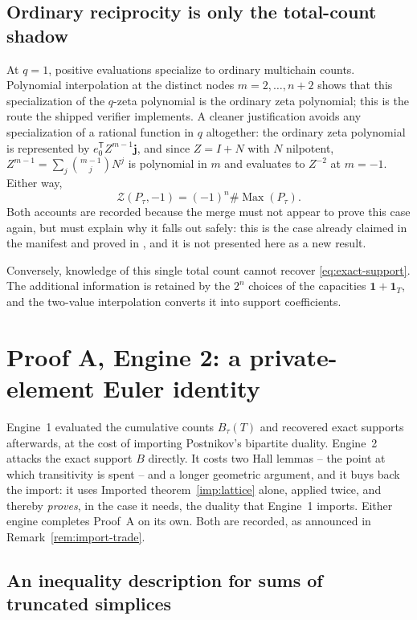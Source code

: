 \documentclass[11pt]{article}
\numberwithin{equation}{section}
\theoremstyle{definition}
\theoremstyle{remark}
\newcommand{\one}{\mathbf 1}
\newcommand{\Max}{\operatorname{Max}}
\newcommand{\Zeta}{\mathcal Z}
\begin{document}
\subsection{Ordinary reciprocity is only the total-count shadow}
\label{sec:shadow}

At $q=1$, positive evaluations specialize to ordinary multichain counts.
Polynomial interpolation at the distinct nodes $m=2,\ldots,n+2$ shows that
this specialization of the $q$-zeta polynomial is the ordinary zeta
polynomial; this is the route the shipped verifier implements. A cleaner
justification avoids any specialization of a rational function in $q$
altogether: the ordinary zeta polynomial is represented by
$e_0^{\mathsf T}Z^{m-1}\mathbf j$, and since $Z=I+N$ with $N$ nilpotent,
$Z^{m-1}=\sum_j\binom{m-1}{j}N^j$ is polynomial in $m$ and evaluates to
$Z^{-2}$ at $m=-1$. Either way,
\[
 \Zeta(P_\tau,-1)=(-1)^n\#\Max(P_\tau).
\]
Both accounts are recorded because the merge must not appear to prove this
case again, but must explain why it falls out safely: this is the case already
claimed in the manifest and proved in \cite{PriorReciprocity}, and it is not
presented here as a new result.

Conversely, knowledge of this single total count cannot recover
\eqref{eq:exact-support}. The additional information is retained by the $2^n$
choices of the capacities $\one+\one_T$, and the two-value interpolation
converts it into support coefficients.

\section{Proof A, Engine 2: a private-element Euler identity}
\label{sec:private}

Engine~1 evaluated the cumulative counts $B_\tau(T)$ and recovered exact
supports afterwards, at the cost of importing Postnikov's bipartite duality.
Engine~2 attacks the exact support $B$ directly. It costs two Hall lemmas --
the point at which transitivity is spent -- and a longer geometric argument,
and it buys back the import: it uses Imported theorem~\ref{imp:lattice} alone,
applied twice, and thereby \emph{proves}, in the case it needs, the duality
that Engine~1 imports. Either engine completes Proof~A on its own. Both are
recorded, as announced in Remark~\ref{rem:import-trade}.

\subsection{An inequality description for sums of truncated simplices}
\end{document}
